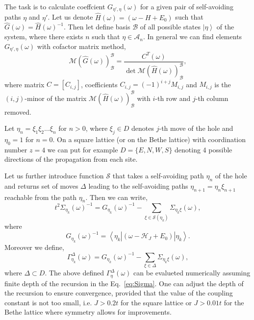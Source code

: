 \documentclass[%
 reprint,
 amsmath,amssymb,
 aps,
prb,
floatfix,
]{revtex4-1}
\newcommand{\ket}[1]{\left\vert #1 \right\rangle}
\newcommand{\bra}[1]{\left\langle #1 \right\vert}
\begin{document}
The task is to calculate coeffcient $G_{\eta', \eta}(\omega)$ for a given pair of self-avoiding paths $\eta$ and $\eta'$.
Let us denote $\hat{H}(\omega) = (\omega - H + E_0)$ such that $\hat{G}(\omega) = \hat{H}(\omega)^{-1}$. Then let define basis $\mathcal{B}$ of all possible states $\ket{\eta}$ of the system, where there exists $n$ such that $\eta \in \mathcal{A}_n$. In general we can find elements $G_{\eta', \eta}(\omega)$ with cofactor matrix method,
\begin{equation}
    \mathcal{M}(\hat{G}(\omega))_\mathcal{B}^\mathcal{B} = 
    \frac{C^{T}(\omega)}{\det \mathcal{M}(\hat{H}(\omega))_\mathcal{B}^\mathcal{B}},
\end{equation}
where matrix $C = [C_{i,j}]$, coefficients $C_{i,j} = (-1)^{i+j}M_{i,j}$ and $M_{i,j}$ is the $(i,j)$-minor of the matrix $\mathcal{M}(\hat{H}(\omega))_\mathcal{B}^\mathcal{B}$ with $i$-th row and $j$-th column removed. 

Let $\eta_n = \xi_1 \xi_2 \hdots \xi_n$ for $n>0$, where $\xi_j \in D$ denotes $j$-th move of the hole and $\eta_0 = 1$ for $n=0$. On a square lattice (or on the Bethe lattice) with coordination number $z=4$ we can put for example $D = \{E,N,W,S\}$ denoting 4 possible directions of the propagation from each site.

Let us further introduce function $\mathcal{S}$ that takes a self-avoiding path $\eta_n$ of the hole and returns set of moves $\Delta$ leading to the self-avoiding paths $\eta_{n+1} = \eta_n \xi_{n+1}$ reachable from the path $\eta_n$. Then we can write,
\begin{equation}\label{eq:Sigma}
    t^2\Sigma_{\eta_k}(\omega)^{-1} = G_{\eta_k}(\omega)^{-1} - \sum_{\xi \in \mathcal{S}(\eta_k)}\Sigma_{\eta_k \xi}(\omega),
\end{equation}
where
\begin{equation}
    G_{\eta_k}(\omega)^{-1} = 
    \bra{\eta_k}
    \left(
        \omega - \mathcal{H}_J + E_{0}
    \right)
    \ket{\eta_k}.
\end{equation}
Moreover we define,
\begin{equation}\label{eq:Gamma}
    \Gamma_{\eta_k}^{\Delta}(\omega) = G_{\eta_k}(\omega)^{-1} - \sum_{\xi \in \Delta}\Sigma_{\eta_k \xi}(\omega),
\end{equation}
where $\Delta \subset D$. The above defined $\Gamma_\eta^{\Delta}(\omega)$ can be evalueted numerically assuming finite depth of the recursion in the Eq.~\eqref{eq:Sigma}. One can adjust the depth of the recursion to ensure convergence, provided that the value of the coupling constant is not too small, i.e. $J > 0.2t$ for the square lattice or $J > 0.01t$ for the Bethe lattice where symmetry allows for improvements.
\end{document}
